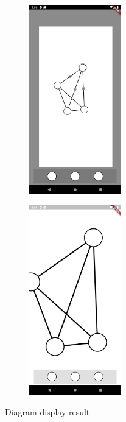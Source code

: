 \begin{figure}[b]
    \begin{subfigure}{0.4\textwidth}
        \centering
        \includegraphics[width=4cm]{Images/App/AppDemo1.png}
        \label{fig:demo1}
    \end{subfigure}
    \hfill
    \begin{subfigure}{0.4\textwidth}
        \centering
        \includegraphics[width=4cm]{Images/App/AppDemo2.png}
        \label{fig:demo2}
    \end{subfigure}
    \caption{Diagram display result}
    \label{fig:result}
\end{figure}

